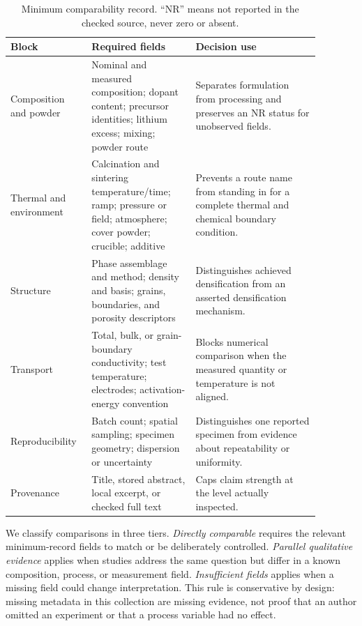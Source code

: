 \begin{table}[t]
\centering
\caption{Minimum comparability record. ``NR'' means not reported in the checked source, never zero or absent.}
\label{tab:min-record}
\small
\begin{tabular}{P{0.20\linewidth}P{0.31\linewidth}P{0.37\linewidth}}
\toprule
Block & Required fields & Decision use \\
\midrule
Composition and powder & Nominal and measured composition; dopant content; precursor identities; lithium excess; mixing; powder route & Separates formulation from processing and preserves an NR status for unobserved fields. \\
Thermal and environment & Calcination and sintering temperature\slash time; ramp; pressure or field; atmosphere; cover powder; crucible; additive & Prevents a route name from standing in for a complete thermal and chemical boundary condition. \\
Structure & Phase assemblage and method; density and basis; grains, boundaries, and porosity descriptors & Distinguishes achieved densification from an asserted densification mechanism. \\
Transport & Total, bulk, or grain-boundary conductivity; test temperature; electrodes; activation-energy convention & Blocks numerical comparison when the measured quantity or temperature is not aligned. \\
Reproducibility & Batch count; spatial sampling; specimen geometry; dispersion or uncertainty & Distinguishes one reported specimen from evidence about repeatability or uniformity. \\
Provenance & Title, stored abstract, local excerpt, or checked full text & Caps claim strength at the level actually inspected. \\
\bottomrule
\end{tabular}
\end{table}

We classify comparisons in three tiers. \emph{Directly comparable} requires the relevant minimum-record fields to match or be deliberately controlled. \emph{Parallel qualitative evidence} applies when studies address the same question but differ in a known composition, process, or measurement field. \emph{Insufficient fields} applies when a missing field could change interpretation. This rule is conservative by design: missing metadata in this collection are missing evidence, not proof that an author omitted an experiment or that a process variable had no effect.

